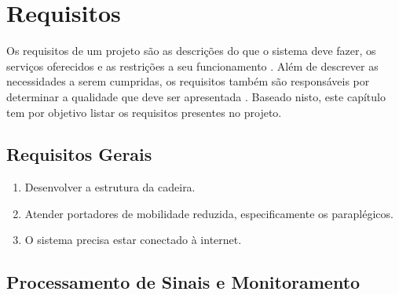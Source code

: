 \chapter{Requisitos}

Os requisitos de um projeto são as descrições do que o sistema deve fazer, os
serviços oferecidos e as restrições a seu funcionamento \cite{sommerville}.
Além de descrever as necessidades a serem cumpridas, os requisitos também são
responsáveis por determinar a qualidade que deve ser apresentada \cite{robertson}.
Baseado nisto, este capítulo tem por objetivo listar os requisitos presentes
no projeto.

\section{Requisitos Gerais}

\begin{enumerate}
  \item Desenvolver a estrutura da cadeira.
  \item Atender portadores de mobilidade reduzida, especificamente os paraplégicos.
  \item O sistema precisa estar conectado à internet.
\end{enumerate}

\section{Processamento de Sinais e Monitoramento}

